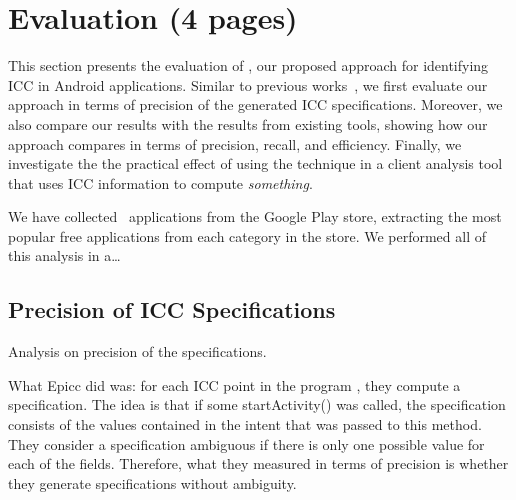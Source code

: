 \section{Evaluation (4 pages)}



This section presents the evaluation of \tname{}, our proposed approach for identifying ICC in Android applications. Similar to previous works~\cite{epicc}, we first evaluate our approach in terms of precision of the generated ICC specifications. Moreover, we also compare our results with the results from existing tools, showing how our approach compares in terms of precision, recall, and efficiency. Finally, we investigate the the practical effect of using the technique in a client analysis tool that uses ICC information to compute \emph{something}. 

We have collected \totalapps{}~applications from the Google Play store, extracting the most popular free applications from each category in the store. We performed all of this analysis in a\ldots {}

\subsection{Precision of ICC Specifications}

Analysis on precision of the specifications. 

What Epicc did was: for each ICC point in the program , they compute a specification. The idea is that if some startActivity() was called, the specification consists of the values contained in the intent that was passed to this method. They consider a specification ambiguous if there is only one possible value for each of the fields. Therefore, what they measured in terms of precision is whether they generate specifications without ambiguity. 

